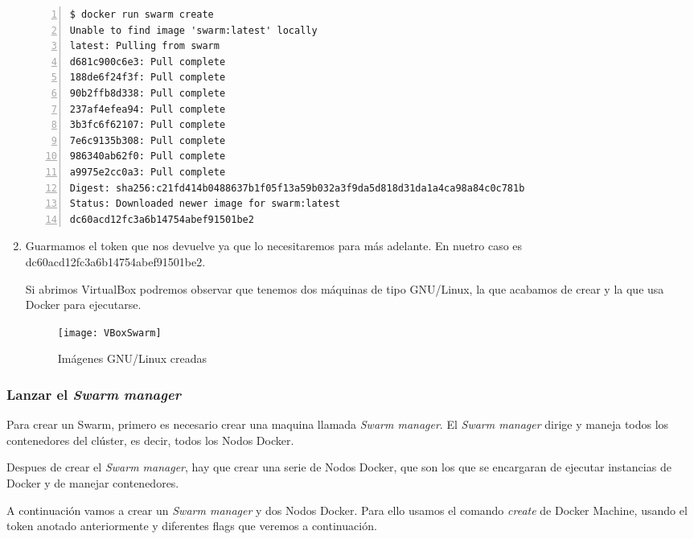 \begin{enumerate}
				\begin{lstlisting}[style=consola,numbers=left]
$ docker run swarm create
Unable to find image 'swarm:latest' locally
latest: Pulling from swarm
d681c900c6e3: Pull complete
188de6f24f3f: Pull complete
90b2ffb8d338: Pull complete
237af4efea94: Pull complete
3b3fc6f62107: Pull complete
7e6c9135b308: Pull complete
986340ab62f0: Pull complete
a9975e2cc0a3: Pull complete
Digest: sha256:c21fd414b0488637b1f05f13a59b032a3f9da5d818d31da1a4ca98a84c0c781b
Status: Downloaded newer image for swarm:latest
dc60acd12fc3a6b14754abef91501be2
				\end{lstlisting}
			
				\item Guarmamos el token que nos devuelve ya que lo necesitaremos para más adelante. En nuetro caso es dc60acd12fc3a6b14754abef91501be2.
				
				Si abrimos VirtualBox podremos observar que tenemos dos máquinas de tipo GNU/Linux, la que acabamos de crear y la que usa Docker para ejecutarse.
				
				\begin{figure}[H] %
					\centering
					\texttt{[image: VBoxSwarm]}
					\caption{Imágenes GNU/Linux creadas}
					\label{fig:VBoxSwarm}
				\end{figure}
			
			\end{enumerate}
			
			\subsubsection{Lanzar el \textit{Swarm manager}}
			Para crear un Swarm, primero es necesario crear una maquina llamada \textit{Swarm manager}. El \textit{Swarm manager} dirige y maneja todos los contenedores del clúster, es decir, todos los Nodos Docker.
			
			Despues de crear el \textit{Swarm manager}, hay que crear una serie de Nodos Docker, que son los que se encargaran de ejecutar instancias de Docker y de manejar contenedores.
			
			A continuación vamos a crear un \textit{Swarm manager} y dos Nodos Docker. Para ello usamos el comando \textit{create} de Docker Machine, usando el token anotado anteriormente y diferentes flags que veremos a continuación.
			
